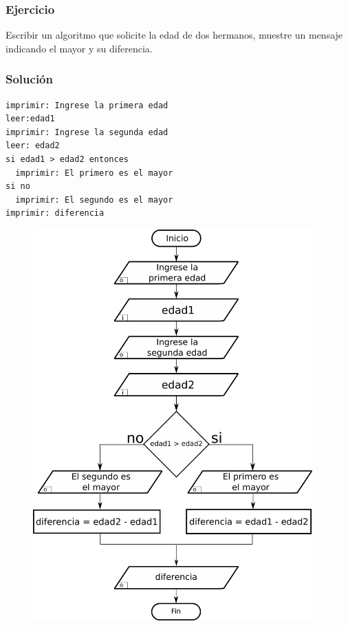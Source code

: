 \pagebreak

\subsubsection{Ejercicio}
Escribir un algoritmo que solicite la edad de dos hermanos, muestre un mensaje indicando el mayor y su diferencia.

\subsubsection*{Solución}
\begin{lstlisting}[style=pseudocodigo]
imprimir: Ingrese la primera edad
leer:edad1
imprimir: Ingrese la segunda edad
leer: edad2
si edad1 > edad2 entonces
  imprimir: El primero es el mayor
si no
  imprimir: El segundo es el mayor
imprimir: diferencia
\end{lstlisting}

\begin{figure}[h!]
  \centering
  \includegraphics[height=150mm]{./img/ejercicio_2.pdf} 
\end{figure}

\pagebreak

